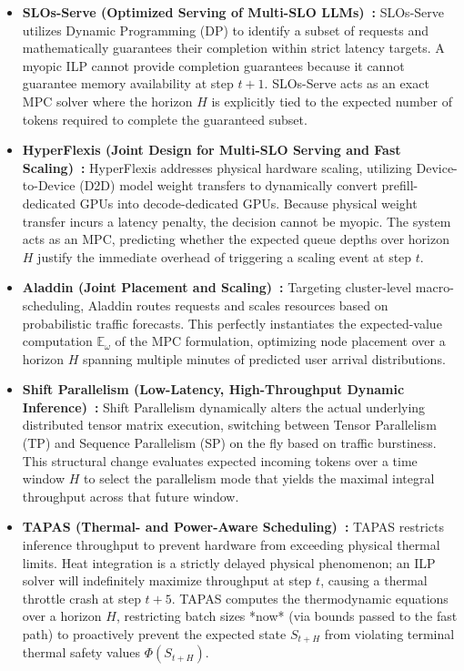 \documentclass[11pt]{article}
\begin{document}
\begin{itemize}
    \item \textbf{SLOs-Serve (Optimized Serving of Multi-SLO LLMs)~\citep{chen2025slos}:} SLOs-Serve utilizes Dynamic Programming (DP) to identify a subset of requests and mathematically guarantees their completion within strict latency targets. A myopic ILP cannot provide completion guarantees because it cannot guarantee memory availability at step $t+1$. SLOs-Serve acts as an exact MPC solver where the horizon $H$ is explicitly tied to the expected number of tokens required to complete the guaranteed subset.
    
    \item \textbf{HyperFlexis (Joint Design for Multi-SLO Serving and Fast Scaling)~\citep{yousefijamarani2025hyperflexis}:} HyperFlexis addresses physical hardware scaling, utilizing Device-to-Device (D2D) model weight transfers to dynamically convert prefill-dedicated GPUs into decode-dedicated GPUs. Because physical weight transfer incurs a latency penalty, the decision cannot be myopic. The system acts as an MPC, predicting whether the expected queue depths over horizon $H$ justify the immediate overhead of triggering a scaling event at step $t$.
    
    \item \textbf{Aladdin (Joint Placement and Scaling)~\citep{nie2024aladdin}:} Targeting cluster-level macro-scheduling, Aladdin routes requests and scales resources based on probabilistic traffic forecasts. This perfectly instantiates the expected-value computation $\mathbb{E}_{\omega}$ of the MPC formulation, optimizing node placement over a horizon $H$ spanning multiple minutes of predicted user arrival distributions.
    
    \item \textbf{Shift Parallelism (Low-Latency, High-Throughput Dynamic Inference)~\citep{hidayetoglu2026shift}:} Shift Parallelism dynamically alters the actual underlying distributed tensor matrix execution, switching between Tensor Parallelism (TP) and Sequence Parallelism (SP) on the fly based on traffic burstiness. This structural change evaluates expected incoming tokens over a time window $H$ to select the parallelism mode that yields the maximal integral throughput across that future window.
    
    \item \textbf{TAPAS (Thermal- and Power-Aware Scheduling)~\citep{stojkovic2025tapas}:} TAPAS restricts inference throughput to prevent hardware from exceeding physical thermal limits. Heat integration is a strictly delayed physical phenomenon; an ILP solver will indefinitely maximize throughput at step $t$, causing a thermal throttle crash at step $t+5$. TAPAS computes the thermodynamic equations over a horizon $H$, restricting batch sizes *now* (via bounds passed to the fast path) to proactively prevent the expected state $S_{t+H}$ from violating terminal thermal safety values $\Phi(S_{t+H})$.
\end{itemize}
\end{document}
